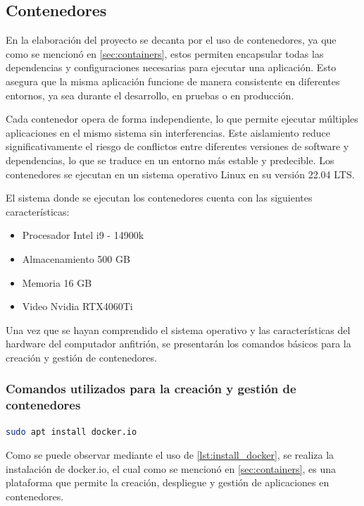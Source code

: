 \subsection{Contenedores}

En la elaboración del proyecto se decanta por el uso de contenedores, ya que como se mencionó en \ref{sec:containers}, estos permiten encapsular todas las dependencias y configuraciones necesarias para ejecutar una aplicación. Esto asegura que la misma aplicación funcione de manera consistente en diferentes entornos, ya sea durante el desarrollo, en pruebas o en producción. 

Cada contenedor opera de forma independiente, lo que permite ejecutar múltiples aplicaciones en el mismo sistema sin interferencias. Este aislamiento reduce significativamente el riesgo de conflictos entre diferentes versiones de software y dependencias, lo que se traduce en un entorno más estable y predecible. Los contenedores se ejecutan en un sistema operativo Linux en su versión 22.04 LTS.

El sistema donde se ejecutan los contenedores cuenta con las siguientes características:

\begin{itemize}
    \item Procesador Intel i9 - 14900k
    \item Almacenamiento 500 GB 
    \item Memoria 16 GB
    \item Video Nvidia RTX4060Ti
\end{itemize}

Una vez que se hayan comprendido el sistema operativo y las características del hardware del computador anfitrión, se presentarán los comandos básicos para la creación y gestión de contenedores.

\subsubsection{Comandos utilizados para la creación y gestión de contenedores}\label{subsec:manejo_de_contenedores}


\begin{lstlisting}[language=bash, caption={Instalacion de docker, Linux}, label=lst:install_docker]
    sudo apt install docker.io
\end{lstlisting}

Como se puede observar mediante el uso de \ref{lst:install_docker}, se realiza la instalación de docker.io, el cual como se mencionó en \ref{sec:containers}, es una plataforma que permite la creación, despliegue y gestión de aplicaciones en contenedores. 

